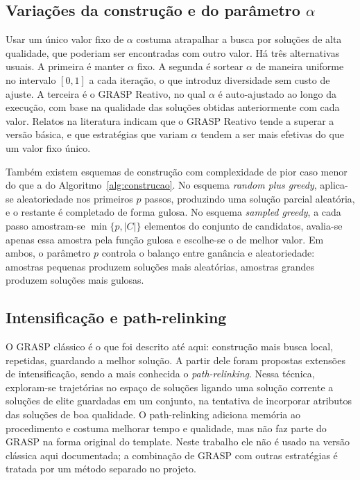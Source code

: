 \documentclass[11pt,a4paper]{article}
\begin{document}
\subsection{Variações da construção e do parâmetro \texorpdfstring{$\alpha$}{alpha}}

Usar um único valor fixo de $\alpha$ costuma atrapalhar a busca por soluções de alta qualidade, que poderiam ser encontradas com outro valor. Há três alternativas usuais. A primeira é manter $\alpha$ fixo. A segunda é sortear $\alpha$ de maneira uniforme no intervalo $[0,1]$ a cada iteração, o que introduz diversidade sem custo de ajuste. A terceira é o GRASP Reativo, no qual $\alpha$ é auto-ajustado ao longo da execução, com base na qualidade das soluções obtidas anteriormente com cada valor. Relatos na literatura indicam que o GRASP Reativo tende a superar a versão básica, e que estratégias que variam $\alpha$ tendem a ser mais efetivas do que um valor fixo único.

Também existem esquemas de construção com complexidade de pior caso menor do que a do Algoritmo~\ref{alg:construcao}. No esquema \emph{random plus greedy}, aplica-se aleatoriedade nos primeiros $p$ passos, produzindo uma solução parcial aleatória, e o restante é completado de forma gulosa. No esquema \emph{sampled greedy}, a cada passo amostram-se $\min\{p, |C|\}$ elementos do conjunto de candidatos, avalia-se apenas essa amostra pela função gulosa e escolhe-se o de melhor valor. Em ambos, o parâmetro $p$ controla o balanço entre ganância e aleatoriedade: amostras pequenas produzem soluções mais aleatórias, amostras grandes produzem soluções mais gulosas.

\subsection{Intensificação e path-relinking}

O GRASP clássico é o que foi descrito até aqui: construção mais busca local, repetidas, guardando a melhor solução. A partir dele foram propostas extensões de intensificação, sendo a mais conhecida o \emph{path-relinking}. Nessa técnica, exploram-se trajetórias no espaço de soluções ligando uma solução corrente a soluções de elite guardadas em um conjunto, na tentativa de incorporar atributos das soluções de boa qualidade. O path-relinking adiciona memória ao procedimento e costuma melhorar tempo e qualidade, mas não faz parte do GRASP na forma original do template. Neste trabalho ele não é usado na versão clássica aqui documentada; a combinação de GRASP com outras estratégias é tratada por um método separado no projeto.
\end{document}
